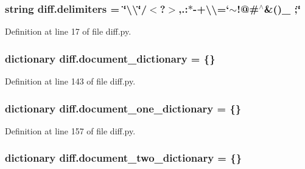 \subsubsection[{\texorpdfstring{delimiters}{delimiters}}]{\setlength{\rightskip}{0pt plus 5cm}string diff.\+delimiters = \char`\"{}\textbackslash{}\textquotesingle{}\textbackslash{}\char`\"{}/$<$?$>$,.\+:$\ast$-\/+\textbackslash{}\textbackslash{}=`$\sim$!@\#$^\wedge$\&()\+\_\+ ;\char`\"{}}\hypertarget{namespacediff_a46e2544bf0f797b8d42f4985d4b9bf0a}{}\label{namespacediff_a46e2544bf0f797b8d42f4985d4b9bf0a}


Definition at line 17 of file diff.\+py.

\subsubsection[{\texorpdfstring{document\+\_\+dictionary}{document_dictionary}}]{\setlength{\rightskip}{0pt plus 5cm}dictionary diff.\+document\+\_\+dictionary = \{\}}\hypertarget{namespacediff_a7d02a567fcd601900d3960bef0191cea}{}\label{namespacediff_a7d02a567fcd601900d3960bef0191cea}


Definition at line 143 of file diff.\+py.

\subsubsection[{\texorpdfstring{document\+\_\+one\+\_\+dictionary}{document_one_dictionary}}]{\setlength{\rightskip}{0pt plus 5cm}dictionary diff.\+document\+\_\+one\+\_\+dictionary = \{\}}\hypertarget{namespacediff_adb8493e93ac22af9aef08d29989bc40d}{}\label{namespacediff_adb8493e93ac22af9aef08d29989bc40d}


Definition at line 157 of file diff.\+py.

\subsubsection[{\texorpdfstring{document\+\_\+two\+\_\+dictionary}{document_two_dictionary}}]{\setlength{\rightskip}{0pt plus 5cm}dictionary diff.\+document\+\_\+two\+\_\+dictionary = \{\}}\hypertarget{namespacediff_ad928e1eb5cb7ebde52f495bf99c78a3b}{}\label{namespacediff_ad928e1eb5cb7ebde52f495bf99c78a3b}


